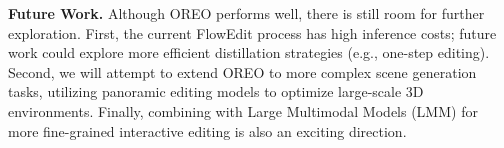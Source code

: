 \documentclass[runningheads]{llncs}
\begin{document}
\textbf{Future Work.} Although OREO performs well, there is still room for further exploration. First, the current FlowEdit process has high inference costs; future work could explore more efficient distillation strategies (e.g., one-step editing). Second, we will attempt to extend OREO to more complex scene generation tasks, utilizing panoramic editing models to optimize large-scale 3D environments. Finally, combining with Large Multimodal Models (LMM) for more fine-grained interactive editing is also an exciting direction.

\clearpage



\end{document}
